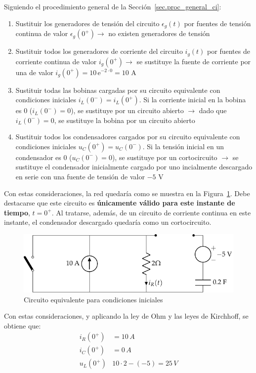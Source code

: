 \begin{example}
  Siguiendo el procedimiento general de la
  Sección~\ref{sec.proc_general_ci}:
  \begin{enumerate}
  \item Sustituir los generadores de tensión del circuito
    $\epsilon_g(t)$ por fuentes de tensión continua de valor
    $\epsilon_g(0^+) \rightarrow$ no existen generadores de tensión
  \item Sustituir todos los generadores de corriente del circuito
    $i_g(t)$ por fuentes de corriente continua de valor
    $i_g(0^+)\rightarrow$ se sustituye la fuente de corriente por una
    de valor $i_g(0^+)=10\,\mathrm{e}^{-2\cdot 0}=10$ A
  \item Sustituir todas las bobinas cargadas por su circuito
    equivalente con condiciones iniciales $i_L(0^-)=i_L(0^+)$. Si la
    corriente inicial en la bobina es 0 ($i_L(0^-)=0$), se sustituye
    por un circuito abierto $\rightarrow$ dado que $i_L(0^-)=0$, se
    sustituye la bobina por un circuito abierto
  \item Sustituir todos los condensadores cargados por su circuito
    equivalente con condiciones iniciales $u_C(0^+)=u_C(0^-)$. Si la
    tensión inicial en un condensador es 0 ($u_C(0^-)=0$), se
    sustituye por un cortocircuito $\rightarrow$ se sustituye el
    condensador inicialmente cargado por uno incialmente descargado en
    serie con una fuente de tensión de valor $-5$ V
  \end{enumerate}
  Con estas consideraciones, la red quedaría como se muestra en la
  Figura~\ref{fig.ej_cond_iniciales_0+}. Debe destacarse que este
  circuito es \textbf{únicamente válido para este instante de tiempo},
  $t=0^+$. Al tratarse, además, de un circuito de corriente continua
  en este instante, el condensador descargado quedaría como un
  cortocircuito.
  \begin{figure}[H]
    \centering \includegraphics{../figs/ej_cond_iniciales_0+.pdf}
    \caption{Circuito equivalente para condiciones iniciales}
    \label{fig.ej_cond_iniciales_0+}
  \end{figure}
	
  Con estas consideraciones, y aplicando la ley de Ohm y las leyes de
  Kirchhoff, se obtiene que:
  \begin{align*}
    i_R(0^+)&=10\,A\\
    i_C(0^+)&=0\,A\\
    u_L(0^+)&10\cdot 2 - (-5)=25\,V
  \end{align*}
	
\end{example}

